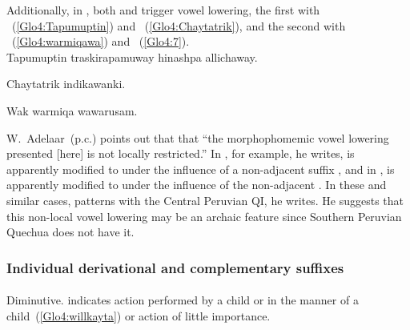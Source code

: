 \noindent
Additionally, in \SYQ, both  and  trigger vowel lowering, the first with ~(\ref{Glo4:Tapumuptin}) and ~(\ref{Glo4:Chaytatrik}), and the second with ~(\ref{Glo4:warmiqawa}) and ~(\ref{Glo4:7}).\\

%
{Tapumuptin traskirapamuway hinashpa allichaway.}%
{}%
{}{}%

%
{Chaytatrik indikawanki.}%
{}%
{}{}%

%
{Wak warmiqa wawarusam.}%
{}%
{}{}%

W.~Adelaar~(p.c.) points out that that “the morphophomemic vowel lowering presented [here] is not locally restricted.” In , for example, he writes,  is apparently modified to  under the influence of a non-adjacent suffix , and in ,  is apparently modified to  under the influence of the non-adjacent . In these and similar cases, \SYQ{} patterns with the Central Peruvian QI, he writes. He suggests that this non-local vowel lowering may be an archaic feature since Southern Peruvian Quechua does not have it.

\subsubsection{Individual derivational and complementary suffixes}\label{ssec:IDCA}
\paragraph{}
Diminutive.  indicates action performed by a child or in the manner of a child~(\ref{Glo4:willkayta}) or action of little importance.\\

